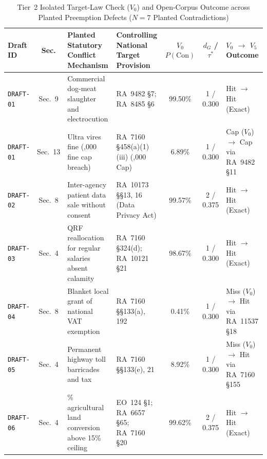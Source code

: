 \begin{table}[htbp]
    \centering
    \scriptsize
    \setlength{\tabcolsep}{1.8pt}
    \renewcommand{\arraystretch}{0.88}
    \caption[Tier 2 Isolated Target-Law Check on Planted Preemption Defects]{Tier~2 Isolated Target-Law Check ($V_0$) and Open-Corpus Outcome across Planted Preemption Defects ($N = 7$ Planted Contradictions)}
    \label{tab:tier2_oracle_diagnostic}
    \begin{tabularx}{\linewidth}{l c >{\RaggedRight\arraybackslash}X >{\RaggedRight\arraybackslash}X c c >{\RaggedRight\arraybackslash}p{2.9cm}}
        \toprule
        \textbf{Draft ID} & \textbf{Sec.} & \textbf{Planted Statutory Conflict Mechanism} & \textbf{Controlling National Target Provision} & \textbf{$V_0$ $P(\text{Con})$} & \textbf{$d_G$ / $\tau^*$} & \textbf{$V_0$ $\rightarrow$ $V_5$ Outcome} \\
        \midrule
        \texttt{DRAFT-01} & Sec.~9 & Commercial dog-meat slaughter and electrocution & RA~9482 \S7; RA~8485 \S6 & 99.50\% & 1 / 0.300 & Hit $\rightarrow$ Hit (Exact) \\
        \texttt{DRAFT-01} & Sec.~13 & Ultra vires fine (\textpeso 50,000 fine cap breach) & RA~7160 \S458(a)(1)(iii) (\textpeso 5,000 Cap) & 6.89\% & 1 / 0.300 & Cap ($V_0$) $\rightarrow$ Cap via RA~9482 \S11 \\
        \texttt{DRAFT-02} & Sec.~8 & Inter-agency patient data sale without consent & RA~10173 \S\S13, 16 (Data Privacy Act) & 99.57\% & 2 / 0.375 & Hit $\rightarrow$ Hit (Exact) \\
        \texttt{DRAFT-03} & Sec.~4 & QRF reallocation for regular salaries absent calamity & RA~7160 \S324(d); RA~10121 \S21 & 98.67\% & 1 / 0.300 & Hit $\rightarrow$ Hit (Exact) \\
        \texttt{DRAFT-04} & Sec.~8 & Blanket local grant of national VAT exemption & RA~7160 \S\S133(a), 192 & 0.41\% & 1 / 0.300 & Miss ($V_0$) $\rightarrow$ Hit via RA~11537 \S18 \\
        \texttt{DRAFT-05} & Sec.~4 & Permanent highway toll barricades and \textpeso 500 tax & RA~7160 \S\S133(e), 21 & 8.92\% & 1 / 0.300 & Miss ($V_0$) $\rightarrow$ Hit via RA~7160 \S155 \\
        \texttt{DRAFT-06} & Sec.~4 & 45\% agricultural land conversion above 15\% ceiling & EO~124 \S1; RA~6657 \S65; RA~7160 \S20 & 99.62\% & 2 / 0.375 & Hit $\rightarrow$ Hit (Exact) \\
        \bottomrule
    \end{tabularx}
\end{table}

